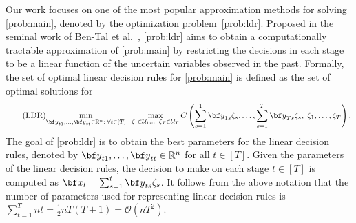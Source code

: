 \documentclass[nonblindrev,mnsc]{informs3} %
\newcommand{\bx}{{\bf x}}
\newcommand{\by}{{\bf y}}
\def\Real{\mathbb{R}}
\let\R\Real
\begin{document}
Our work focuses on one of the most popular approximation methods for solving \eqref{prob:main}, denoted by the optimization problem~\eqref{prob:ldr}. 
Proposed in the seminal work of Ben-Tal et al.~\cite{ben2004adjustable}, \eqref{prob:ldr} aims to obtain a computationally tractable approximation of \eqref{prob:main} by restricting the decisions in each stage to be a linear function of the uncertain variables observed in the past. Formally, the set of optimal linear decision rules for \eqref{prob:main} is defined as the set of optimal solutions for   %
\begin{align} \tag{LDR} \label{prob:ldr}
\underset{\by_{t1},\ldots,\by_{tt} \in \R^{n}: \; \forall t \in [T] }{\textnormal{min}}  \;\;\max_{\zeta_1 \in \mathcal{U}_1,\ldots,\zeta_T \in \mathcal{U}_T} C \left(\sum_{s=1}^1 \by_{1s} \zeta_s,\ldots,\sum_{s=1}^T \by_{Ts} \zeta_s, \;\zeta_1,\ldots,\zeta_T \right). 
\end{align}
The goal of \eqref{prob:ldr} is to obtain the best parameters for the linear decision rules, denoted by  $\by_{t1},\ldots,\by_{tt} \in \R^n$ for all $t \in [T]$. Given the parameters of the linear decision rules, the decision to make on each stage $t \in [T]$ is computed as  $\bx_t=\sum_{s=1}^t \by_{ts} \zeta_s$. 
It follows from the above notation that the number of parameters used for representing linear decision rules is $\sum_{t=1}^T n t = \frac{1}{2}nT(T+1) = \mathcal{O}(nT^2)$.
\end{document}
